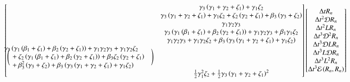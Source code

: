 \documentclass[letterpaper,11pt]{amsart}
\begin{document}
\begin{align}
{\begin{bmatrix}
  &\gamma_{3} \left( \gamma_{1} + \gamma_{2} + \zeta_{1} \right)
  + \gamma_{1} \zeta_{2} \\
  &\gamma_{3} \left( \gamma_{1} + \gamma_{2} + \zeta_{1} \right)
  + \gamma_{1} \zeta_{2}
  + \zeta_{2} \left( \gamma_{2} + \zeta_{1} \right)
  + \beta_{3} \left( \gamma_{3} + \zeta_{2} \right) \\
  &\gamma_{1} \gamma_{2} \gamma_{3} \\
  &\gamma_{3} \left(
      \gamma_{1} \left(  \beta_{1} + \zeta_{1} \right)
      + \beta_{2} \left( \gamma_{2} + \zeta_{1} \right)
    \right)
  + \gamma_{1} \gamma_{2} \gamma_{3}
  + \beta_{1} \gamma_{1} \zeta_{2} \\
  &\gamma_{1} \gamma_{2} \gamma_{3}
  + \gamma_{1} \gamma_{2} \zeta_{2}
  + \beta_{3} \left(
      \gamma_{3} \left( \gamma_{1} + \gamma_{2} + \zeta_{1} \right)
    + \gamma_{1} \zeta_{2}
    \right) \\
%
\Bigg(\mspace{-18mu}
\begin{split}
  &\gamma_{3} \left(
      \gamma_{1} \left(  \beta_{1} + \zeta_{1} \right)
      + \beta_{2} \left( \gamma_{2} + \zeta_{1} \right)
    \right)
  + \gamma_{1} \gamma_{2} \gamma_{3}
  + \gamma_{1} \gamma_{2} \zeta_{2}
  \\
  &\quad+ \zeta_{2} \left(
        \gamma_{1} \left( \beta_{1} + \zeta_{1} \right)
      + \beta_{2} \left( \gamma_{2} + \zeta_{1} \right)
    \right)
  + \beta_{3} \zeta_{2} \left( \gamma_{2} + \zeta_{1} \right)
  \\
  &\quad+ \beta_{3}^{2} \left( \gamma_{3} + \zeta_{2} \right)
  + \beta_{3} \left(
      \gamma_{3} \left( \gamma_{1} + \gamma_{2} + \zeta_{1} \right)
    + \gamma_{1} \zeta_{2}
    \right)
\end{split}
\mspace{18mu}\Bigg)
  \\
%
  &\frac{1}{2}\gamma_{1}^{2}\zeta_{2}
  + \frac{1}{2}\gamma_{3}\left( \gamma_{1}+\gamma_{2}+\zeta_{1} \right)^{2}
\end{bmatrix}}
\begin{bmatrix}
  \Delta{}t R_{n} \\
  \Delta{}t^{2} \mathcal{D} R_{n} \\
  \Delta{}t^{2} L R_{n} \\
  \Delta{}t^{3} \mathcal{D}^{2} R_{n} \\
  \Delta{}t^{3} \mathcal{D} L R_{n} \\
  \Delta{}t^{3} L \mathcal{D} R_{n} \\
  \Delta{}t^{3} L^{2} R_{n} \\
  \Delta{}t^{3} \mathcal{E}\left( R_{n}, R_{n} \right)

\end{bmatrix}
\end{align}
\end{document}

